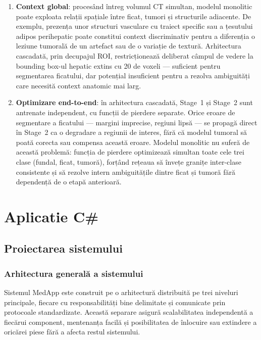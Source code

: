 \documentclass[12pt, a4paper]{report}
\begin{document}
\begin{enumerate}
    \item \textbf{Context global}: procesând întreg volumul CT simultan, modelul
    monolitic poate exploata relații spațiale între ficat, tumori și structurile
    adiacente. De exemplu, prezența unor structuri vasculare cu traiect specific
    sau a țesutului adipos perihepatic poate constitui context discriminativ pentru
    a diferenția o leziune tumorală de un artefact sau de o variație de textură.
    Arhitectura cascadată, prin decupajul ROI, restricționează deliberat câmpul de
    vedere la bounding box-ul hepatic extins cu 20 de voxeli — suficient pentru
    segmentarea ficatului, dar potențial insuficient pentru a rezolva ambiguități
    care necesită context anatomic mai larg.

    \item \textbf{Optimizare end-to-end}: în arhitectura cascadată, Stage~1 și
    Stage~2 sunt antrenate independent, cu funcții de pierdere separate. Orice
    eroare de segmentare a ficatului — margini imprecise, regiuni lipsă — se
    propagă direct în Stage~2 ca o degradare a regiunii de interes, fără că
    modelul tumoral să poată corecta sau compensa această eroare. Modelul monolitic
    nu suferă de această problemă: funcția de pierdere optimizează simultan toate
    cele trei clase (fundal, ficat, tumoră), forțând rețeaua să învețe granițe
    inter-clase consistente și să rezolve intern ambiguitățile dintre ficat și
    tumoră fără dependență de o etapă anterioară.
\end{enumerate}


\chapter{Aplicatie C\#}
\section{Proiectarea sistemului}

\subsection{Arhitectura generală a sistemului}

Sistemul MedApp este construit pe o arhitectură distribuită pe trei niveluri principale,
fiecare cu responsabilități bine delimitate și comunicate prin protocoale standardizate.
Această separare asigură scalabilitatea independentă a fiecărui component, mentenanța
facilă și posibilitatea de înlocuire sau extindere a oricărei piese fără a afecta restul
sistemului.
\end{document}
